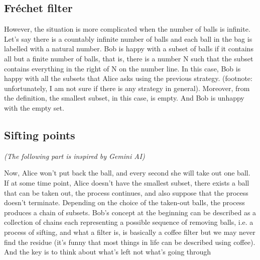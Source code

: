 \documentclass{article}
\begin{document}
\subsection{Fréchet filter}
However, the situation is more complicated when the number of balls is infinite. Let's say there is a countably infinite number of balls and each ball in the bag is labelled with a natural number. Bob is happy with a subset of balls if it contains all but a finite number of balls, that is, there is a number N such that the subset contains everything in the right of N on the number line. In this case, Bob is happy with all the subsets that Alice asks using the previous strategy. (footnote: unfortunately, I am not sure if there is any strategy in general). Moreover, from the definition, the smallest subset, in this case, is empty. And Bob is unhappy with the empty set.

\subsection{Sifting points}
\textit{(The following part is inspired by Gemini AI)}

Now, Alice won't put back the ball, and every second she will take out one ball. If at some time point, Alice doesn't have the smallest subset, there exists a ball that can be taken out, the process continues, and also suppose that the process doesn't terminate. Depending on the choice of the taken-out balls, the process produces a chain of subsets. Bob’s concept at the beginning can be described as a collection of chains each representing a possible sequence of removing balls, i.e. a process of sifting, and what a filter is, is basically a coffee filter but we may never find the residue (it's funny that most things in life can be described using coffee). And the key is to think about what's left not what's going through
\end{document}

